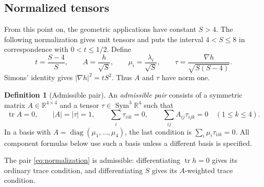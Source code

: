\documentclass[11pt,a4paper]{amsart}
\numberwithin{equation}{section}
\theoremstyle{definition}
\newtheorem{definition}[theorem]{Definition}
\theoremstyle{remark}
\DeclareMathOperator{\tr}{tr}
\DeclareMathOperator{\diag}{diag}
\DeclareMathOperator{\Sym}{Sym}
\newcommand{\R}{\mathbb R}
\begin{document}
\subsection{Normalized tensors}
From this point on, the geometric applications have constant $S>4$.
The following normalization gives unit tensors and puts the interval
$4<S\le8$ in correspondence with $0<t\le1/2$. Define
\begin{equation}\label{eq:normalization}
 t=\frac{S-4}{S},\qquad A=\frac h{\sqrt S},\qquad
 \mu_i=\frac{\lambda_i}{\sqrt S},\qquad
 \tau=\frac{\nabla h}{\sqrt{S(S-4)}}.
\end{equation}
Simons' identity gives $|\nabla h|^2=tS^2$. Thus $A$ and $\tau$
have norm one.

\begin{definition}[Admissible pair]\label{def:admissible}
An \emph{admissible pair} consists of a symmetric matrix
$A\in\R^{4\times4}$ and a tensor $\tau\in\Sym^3\R^4$ such that
\begin{equation}\label{eq:admissible}
 \tr A=0,\qquad |A|=|\tau|=1,\qquad
 \sum_i\tau_{iik}=0,\qquad
 \sum_{ij}A_{ij}\tau_{ijk}=0\quad(1\le k\le4).
\end{equation}
In a basis with $A=\diag(\mu_1,\ldots,\mu_4)$, the last condition
is $\sum_i\mu_i\tau_{iik}=0$. All component formulas below use
such a basis unless a different basis is specified.
\end{definition}
The pair \eqref{eq:normalization} is admissible: differentiating
$\tr h=0$ gives its ordinary trace condition, and differentiating
$S$ gives its $A$-weighted trace condition.
\end{document}
